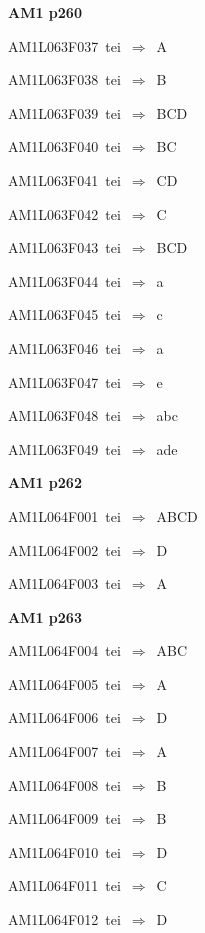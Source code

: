\par\vfill\eject
{\bf\hfill AM1 p260\hfill\hbox{}}\par\bigskip
{\sixrm AM1L063F037\ {\sixit tei}\ }$\Rightarrow$\ A\par\smallskip
{\sixrm AM1L063F038\ {\sixit tei}\ }$\Rightarrow$\ B\par\smallskip
{\sixrm AM1L063F039\ {\sixit tei}\ }$\Rightarrow$\ BCD\par\smallskip
{\sixrm AM1L063F040\ {\sixit tei}\ }$\Rightarrow$\ BC\par\smallskip
{\sixrm AM1L063F041\ {\sixit tei}\ }$\Rightarrow$\ CD\par\smallskip
{\sixrm AM1L063F042\ {\sixit tei}\ }$\Rightarrow$\ C\par\smallskip
{\sixrm AM1L063F043\ {\sixit tei}\ }$\Rightarrow$\ BCD\par\smallskip
{\sixrm AM1L063F044\ {\sixit tei}\ }$\Rightarrow$\ {\tenit a}\par\smallskip
{\sixrm AM1L063F045\ {\sixit tei}\ }$\Rightarrow$\ {\tenit c}\par\smallskip
{\sixrm AM1L063F046\ {\sixit tei}\ }$\Rightarrow$\ {\tenit a}\par\smallskip
{\sixrm AM1L063F047\ {\sixit tei}\ }$\Rightarrow$\ {\tenit e}\par\smallskip
{\sixrm AM1L063F048\ {\sixit tei}\ }$\Rightarrow$\ {\tenit abc}\par\smallskip
{\sixrm AM1L063F049\ {\sixit tei}\ }$\Rightarrow$\ {\tenit ade}\par\smallskip

\par\vfill\eject
{\bf\hfill AM1 p262\hfill\hbox{}}\par\bigskip
{\sixrm AM1L064F001\ {\sixit tei}\ }$\Rightarrow$\ ABCD\par\smallskip
{\sixrm AM1L064F002\ {\sixit tei}\ }$\Rightarrow$\ D\par\smallskip
{\sixrm AM1L064F003\ {\sixit tei}\ }$\Rightarrow$\ A\par\smallskip

\par\vfill\eject
{\bf\hfill AM1 p263\hfill\hbox{}}\par\bigskip
{\sixrm AM1L064F004\ {\sixit tei}\ }$\Rightarrow$\ ABC\par\smallskip
{\sixrm AM1L064F005\ {\sixit tei}\ }$\Rightarrow$\ A\par\smallskip
{\sixrm AM1L064F006\ {\sixit tei}\ }$\Rightarrow$\ D\par\smallskip
{\sixrm AM1L064F007\ {\sixit tei}\ }$\Rightarrow$\ A\par\smallskip
{\sixrm AM1L064F008\ {\sixit tei}\ }$\Rightarrow$\ B\par\smallskip
{\sixrm AM1L064F009\ {\sixit tei}\ }$\Rightarrow$\ B\par\smallskip
{\sixrm AM1L064F010\ {\sixit tei}\ }$\Rightarrow$\ D\par\smallskip
{\sixrm AM1L064F011\ {\sixit tei}\ }$\Rightarrow$\ C\par\smallskip
{\sixrm AM1L064F012\ {\sixit tei}\ }$\Rightarrow$\ D\par\smallskip

